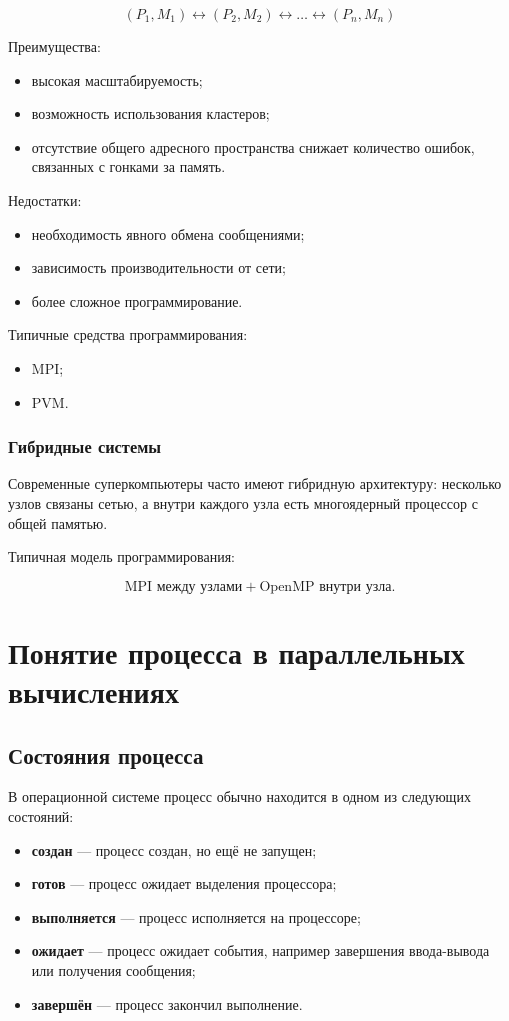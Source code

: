 \documentclass[12pt,a4paper]{article}
\begin{document}
\[
(P_1, M_1) \leftrightarrow (P_2, M_2) \leftrightarrow \ldots \leftrightarrow (P_n, M_n)
\]

Преимущества:
\begin{itemize}
    \item высокая масштабируемость;
    \item возможность использования кластеров;
    \item отсутствие общего адресного пространства снижает количество ошибок, связанных с гонками за память.
\end{itemize}

Недостатки:
\begin{itemize}
    \item необходимость явного обмена сообщениями;
    \item зависимость производительности от сети;
    \item более сложное программирование.
\end{itemize}

Типичные средства программирования:
\begin{itemize}
    \item MPI;
    \item PVM.
\end{itemize}

\subsubsection{Гибридные системы}

Современные суперкомпьютеры часто имеют гибридную архитектуру: несколько узлов связаны сетью, а внутри каждого узла есть многоядерный процессор с общей памятью.

Типичная модель программирования:

\[
\text{MPI между узлами} + \text{OpenMP внутри узла}.
\]

\section{Понятие процесса в параллельных вычислениях}

\subsection{Состояния процесса}

В операционной системе процесс обычно находится в одном из следующих состояний:
\begin{itemize}
    \item \textbf{создан} --- процесс создан, но ещё не запущен;
    \item \textbf{готов} --- процесс ожидает выделения процессора;
    \item \textbf{выполняется} --- процесс исполняется на процессоре;
    \item \textbf{ожидает} --- процесс ожидает события, например завершения ввода-вывода или получения сообщения;
    \item \textbf{завершён} --- процесс закончил выполнение.
\end{itemize}
\end{document}
